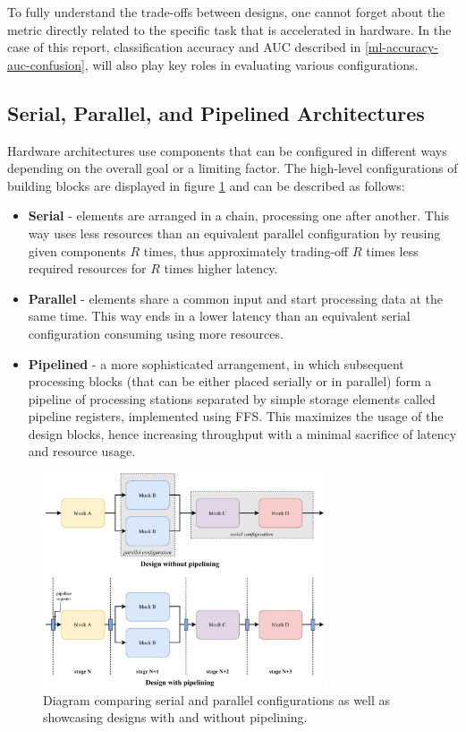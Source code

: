 To fully understand the trade-offs between designs, one cannot forget about the metric directly related to the specific task that is accelerated in hardware. In the case of this report, classification accuracy and AUC described in \cref{ml-accuracy-auc-confusion}, will also play key roles in evaluating various configurations.


\subsection{Serial, Parallel, and Pipelined Architectures}\label{serial-parallel-pipelined}
Hardware architectures use components that can be configured in different ways depending on the overall goal or a limiting factor. The high-level configurations of building blocks are displayed in figure \ref{fig:serial-parallel-pipelined} and can be described as follows:

\begin{itemize}
  \item \textbf{Serial} - elements are arranged in a chain, processing one after another. This way uses less resources than an equivalent parallel configuration by reusing given components \(R\) times, thus approximately trading-off \(R\) times less required resources for \(R\) times higher latency.
  \item \textbf{Parallel} - elements share a common input and start processing data at the same time. This way ends in a lower latency than an equivalent serial configuration consuming using more resources.
  \item \textbf{Pipelined} - a more sophisticated arrangement, in which subsequent processing blocks (that can be either placed serially or in parallel) form a pipeline of processing stations separated by simple storage elements called pipeline registers, implemented using FFS. This maximizes the usage of the design blocks, hence increasing throughput with a minimal sacrifice of latency and resource usage.
\end{itemize}

\begin{figure}[hpt!]
  \centering
  \includegraphics[trim={0cm 0cm 0cm 0cm}, width=0.75\textwidth, center]{background/serial_parallel_pipelined.pdf}
  \caption{Diagram comparing serial and parallel configurations as well as showcasing designs with and without pipelining.}
  \label{fig:serial-parallel-pipelined}
\end{figure}

